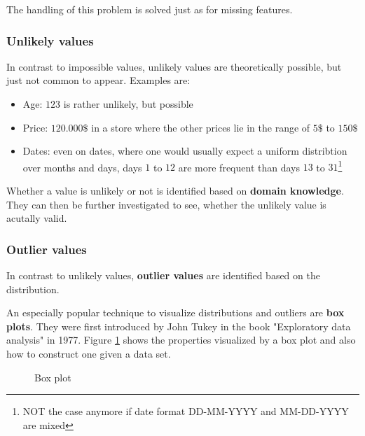 The handling of this problem is solved just as for missing features.

\subsubsection*{Unlikely values}
In contrast to impossible values, unlikely values are theoretically possible, but just not common to appear. Examples are:
\begin{itemize}
  \item Age: $123$ is rather unlikely, but possible
  \item Price: $120.000\$$ in a store where the other prices lie in the range of $5\$$ to $150\$$
  \item Dates: even on dates, where one would usually expect a uniform distribtion over months and days, days $1$ to $12$ are more frequent than days $13$ to $31$\footnote{NOT the case anymore if date format \textcolor{mathblue}{DD-MM-YYYY} and \textcolor{mathblue}{MM-DD-YYYY} are mixed}
\end{itemize}
Whether a value is unlikely or not is identified based on \textbf{domain knowledge}. They can then be further investigated to see, whether the unlikely value is acutally valid.


\subsubsection*{Outlier values}
In contrast to unlikely values, \textbf{outlier values} are identified based on the distribution. 

An especially popular technique to visualize distributions and outliers are \textbf{box plots}. They were first introduced by John Tukey in the book "Exploratory data analysis" in 1977. Figure \ref{fig:2_box_plot} shows the properties visualized by a box plot and also how to construct one given a data set. 

\begin{figure}[h]
  \centering
  \hspace*{0.05\textwidth}
  \caption{Box plot}
  \label{fig:2_box_plot}
\end{figure}

